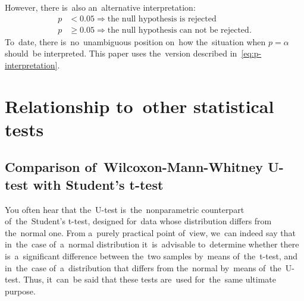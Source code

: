 \documentclass[russian,english]{scrreprt}
\begin{document}
However, there is~also an~alternative interpretation:
\begin{equation}\label{eq:p-interpretation-2}
\begin{aligned}
p &< 0.05 \Rightarrow \text{the~null hypothesis is~rejected}\\
p &\geq 0.05 \Rightarrow \text{the~null hypothesis can~not~be rejected}.
\end{aligned}
\end{equation}
To~date, there is~no~unambiguous position on~how the~situation when $p = \alpha$ should~be interpreted. This paper uses the~version described in~\ref{eq:p-interpretation}.
%
\section{Relationship to~other statistical tests}
\subsection{Comparison of~Wilcoxon-Mann-Whitney U-test with Student's t-test}
You often hear that the~U-test is~the~nonparametric counterpart of~the~Student's t-test, designed for~data whose distribution differs from the~normal one. From a~purely practical point of~view, we~can indeed say that in~the~case of~a~normal distribution it~is~advisable to~determine whether there is~a~significant difference between the~two samples by~means of~the~t-test, and in~the~case of~a~distribution that differs from the~normal by~means of~the~U-test. Thus, it~can~be said that these tests are~used for~the~same ultimate purpose.
\end{document}
